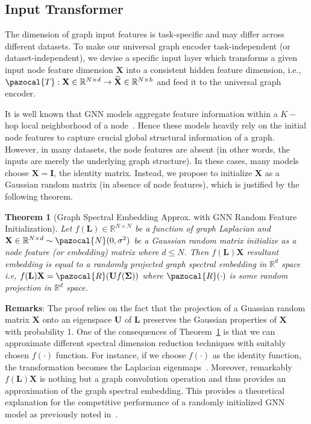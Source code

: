 \documentclass{article}
\newtheorem{theorem}{Theorem}
\newcommand{\Ta}{\pazocal{T}}
\newcommand{\Ra}{\pazocal{R}}
\newcommand{\Na}{\pazocal{N}}
\begin{document}
\vspace{-0.5em}
\subsection{Input Transformer}
\vspace{-0.5em}
The dimension of graph input features is task-specific and may differ across different datasets. To make our  universal graph encoder task-independent (or dataset-independent),  we   devise a   specific input layer which transforms  a given input node feature dimension $\mathbf{X}$ into a consistent  hidden feature dimension, i.e., $ \Ta: \mathbf{X} \in \mathbb{R}^{N \times d} \rightarrow \mathbf{\widetilde{X}} \in \mathbb{R}^{N \times h} $  and feed it to the universal graph encoder. 

It is well known that GNN  models  aggregate  feature information within a $K-$hop local neighborhood of a node~\cite{defferrard2016convolutional}. Hence these models heavily  rely on the  initial node features to capture crucial global structural information of a graph. However, in many datasets, the node features are absent (in other words, the inputs are merely the underlying graph structure). In these cases, many models choose $\mathbf{X}=\mathbf{I}$, the identity matrix.  Instead, we propose to initialize $\mathbf{X}$ as a  Gaussian random matrix (in absence of node features), which is justified by the following theorem.

\begin{theorem}[Graph Spectral Embedding Approx. with GNN Random   Feature Initialization]\label{theorem:gaussian_initialize} 
	Let $f(\mathbf{L})\in \mathbb{R}^{N \times N}$ be a function of graph Laplacian and $\mathbf{X}\in \mathbb{R}^{N \times d}  \sim \Na(0, \sigma^2)$ be a  Gaussian random matrix  initialize as a node feature (or embedding) matrix where $d \leq N$. Then   $f(\mathbf{L})\mathbf{X}$  resultant embedding  is equal to a randomly projected  graph spectral embedding in $\mathbb{R}^{d}$ space i.e, $f(\mathbf{L})\mathbf{X} = \Ra(\mathbf{U}f(\mathbf{\Sigma}))$ where $\Ra(\cdot)$ is some random projection in $\mathbb{R}^{d}$ space.
\end{theorem}

\noindent\textbf{{Remarks}}: The proof relies on the fact that the projection of a Guassian random matrix $\mathbf{X}$  onto an eigenspace $\mathbf{U}$ of $\mathbf{L}$  preserves  the Gaussian properties of $\mathbf{X}$~\cite{paratte2016fast} with probability 1. One of the consequences of Theorem~\ref{theorem:gaussian_initialize} is that  we can approximate different spectral dimension reduction techniques with suitably chosen $f(\cdot)$ function. For instance,  if we choose $f(\cdot)$ as the identity function, the transformation becomes the  Laplacian eigenmaps~\cite{belkin2003laplacian}. Moreover,  remarkably $f(\mathbf{L})\mathbf{X}$ is nothing but a graph convolution operation and thus provides an approximation of the graph spectral embedding. This provides a theoretical explanation for the competitive performance of a randomly initialized GNN model as previously noted in~\cite{kipf2016semi, velivckovic2018deep}. 
\end{document}
